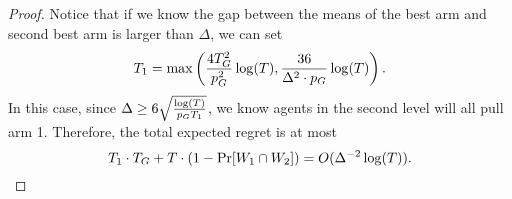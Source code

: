 \begin{proof}
Notice that if we know the gap between the means of the best arm and second best arm is larger than $\Delta$, we can set 
\[
T_1 = \max\left( \frac{4T_G^2}{p_G^2}\log(T), \frac{36 }{\Delta^2 \cdot p_G} \log(T) \right).
\]
In this case, since $\Delta \geq 6 \sqrt{\frac{\log(T)}{p_G T_1 }}$, we know agents in the second level will all pull arm 1. Therefore, the total expected regret is at most
\[
T_1 \cdot T_G + T \cdot (1- \Pr[W_1 \cap W_2]) = O(\Delta^{-2} \log(T)).
\]
\end{proof}